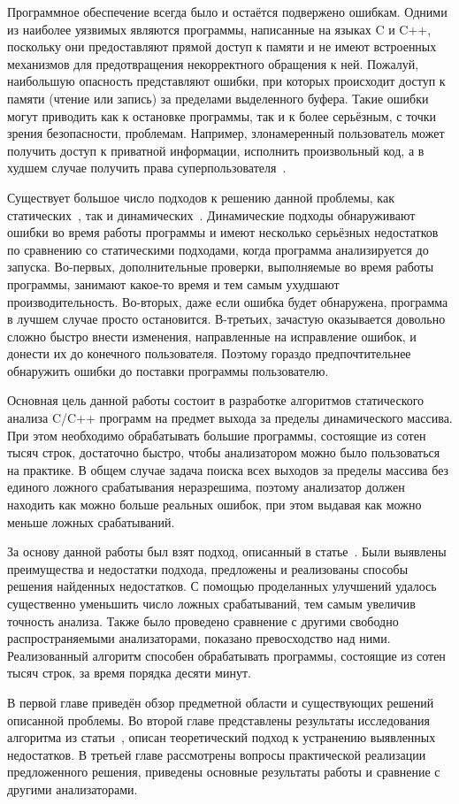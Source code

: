 
Программное обеспечение всегда было и остаётся подвержено
ошибкам. Одними из наиболее уязвимых являются программы, написанные на
языках C и C++, поскольку они предоставляют прямой доступ к памяти и
не имеют встроенных механизмов для предотвращения некорректного
обращения к ней. Пожалуй, наибольшую опасность представляют ошибки,
при которых происходит доступ к памяти (чтение или запись) за
пределами выделенного буфера. Такие ошибки могут приводить как к
остановке программы, так и к более серьёзным, с точки зрения
безопасности, проблемам. Например, злонамеренный пользователь может
получить доступ к приватной информации, исполнить произвольный код, а
в худшем случае получить права суперпользователя~\cite{onesmashing}.

Существует большое число подходов к решению данной проблемы, как
статических~\cite{wagner2000first, xie2003archer, ganapathy2003buffer,
le2008marple, li2010practical}, так и
динамических~\cite{cowan1998stackguard,
ruwase2004practical}. Динамические подходы обнаруживают ошибки во
время работы программы и имеют несколько серьёзных недостатков по
сравнению со статическими подходами, когда программа анализируется до
запуска. Во-первых, дополнительные проверки, выполняемые во время
работы программы, занимают какое-то время и тем самым ухудшают
производительность. Во-вторых, даже если ошибка будет обнаружена,
программа в лучшем случае просто остановится. В-третьих, зачастую
оказывается довольно сложно быстро внести изменения, направленные на
исправление ошибок, и донести их до конечного пользователя. Поэтому
гораздо предпочтительнее обнаружить ошибки до поставки программы
пользователю.

Основная цель данной работы состоит в разработке алгоритмов
статического анализа C/C++ программ на предмет выхода за пределы
динамического массива. При этом необходимо обрабатывать большие
программы, состоящие из сотен тысяч строк, достаточно быстро, чтобы
анализатором можно было пользоваться на практике. В общем случае
задача поиска всех выходов за пределы массива без единого ложного
срабатывания неразрешима, поэтому анализатор должен находить как можно
больше реальных ошибок, при этом выдавая как можно меньше ложных
срабатываний.

За основу данной работы был взят подход, описанный в
статье~\cite{li2010practical}. Были выявлены преимущества и недостатки
подхода, предложены и реализованы способы решения найденных
недостатков. С помощью проделанных улучшений удалось существенно
уменьшить число ложных срабатываний, тем самым увеличив точность
анализа. Также было проведено сравнение с другими свободно
распространяемыми анализаторами, показано превосходство над
ними. Реализованный алгоритм способен обрабатывать программы,
состоящие из сотен тысяч строк, за время порядка десяти минут.

В первой главе приведён обзор предметной области и существующих
решений описанной проблемы. Во второй главе представлены результаты
исследования алгоритма из статьи~\cite{li2010practical}, описан
теоретический подход к устранению выявленных недостатков. В третьей
главе рассмотрены вопросы практической реализации предложенного
решения, приведены основные результаты работы и сравнение с другими
анализаторами.
